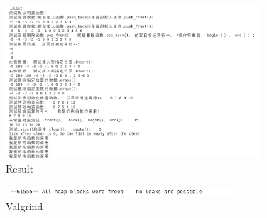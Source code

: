 \documentclass[UTF8]{ctexart}
\begin{document}
\begin{figure}[h]
    \centering
    \includegraphics[width=0.85\textwidth]{result.png} %
    \caption{Result}

\end{figure}

\begin{figure}[h]
    \centering
    \includegraphics[width=0.75\textwidth]{valgrind.png} %
    \caption{Valgrind}
\end{figure}
\end{document}

